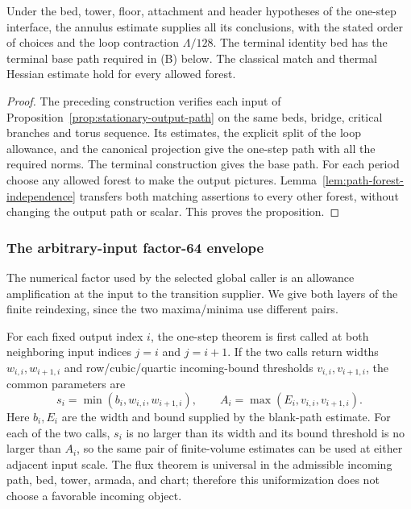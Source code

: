 \begin{proposition}
\label{prop:path-one-step-production}
Under the bed, tower, floor, attachment and header hypotheses of the
one-step interface, the annulus estimate supplies all its conclusions,
with the stated order of choices and the loop contraction $\Lambda/128$.
The terminal identity bed has the terminal base path required in
\textup{(B)} below. The classical match and thermal Hessian estimate hold
for every allowed forest.
\end{proposition}
\begin{proof}
The preceding construction verifies each input of
Proposition~\ref{prop:stationary-output-path} on the same beds, bridge,
critical branches and torus sequence. Its estimates, the explicit
split of the loop allowance, and the canonical projection give the
one-step path with all the required norms. The terminal construction
gives the base path. For each period choose any allowed forest to make
the output pictures. Lemma~\ref{lem:path-forest-independence} transfers
both matching assertions to every other forest, without changing the
output path or scalar. This proves the proposition.
\end{proof}

\subsubsection{The arbitrary-input factor-64 envelope}
\label{subsec:path-factor64-envelope}

The numerical factor used by the selected global caller is an allowance
amplification at the input to the transition supplier. We give both layers
of the finite reindexing, since the two maxima/minima use different pairs.

For each fixed output index $i$, the one-step theorem is first called at
both neighboring input indices $j=i$ and $j=i+1$. If the two calls return widths
$w_{i,i},w_{i+1,i}$ and row/cubic/quartic incoming-bound thresholds
$v_{i,i},v_{i+1,i}$, the common parameters are
\[
 s_i=\min(b_i,w_{i,i},w_{i+1,i}),\qquad
 A_i=\max(E_i,v_{i,i},v_{i+1,i}).
\]
Here $b_i,E_i$ are the width and bound supplied by the blank-path estimate.
For each of the two calls, $s_i$ is no larger than its width and its
bound threshold is no larger than $A_i$, so the same pair of finite-volume
estimates can be used at either adjacent input scale. The flux theorem is
universal in the admissible incoming path, bed, tower, armada, and chart;
therefore this uniformization does not choose a favorable incoming object.

